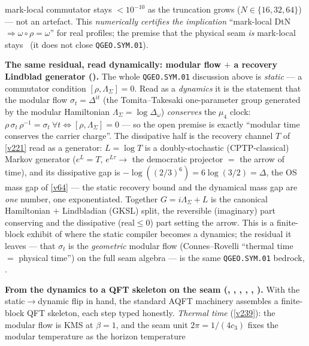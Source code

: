 mark-local commutator stays $<10^{-10}$ as the truncation grows ($N\in\{16,32,64\}$) --- not an artefact.
This \emph{numerically certifies the implication} ``mark-local DtN $\Rightarrow\omega\circ\rho=\omega$'' for
real profiles; the premise that the physical seam \emph{is} mark-local stays \mO\ (it does not close
\texttt{QGEO.SYM.01}).
\par\smallskip\noindent\textbf{The same residual, read dynamically: modular flow $+$ a recovery
Lindblad generator ().} The whole \texttt{QGEO.SYM.01}
discussion above is \emph{static} --- a commutator condition $[\rho,\Lambda_\Sigma]=0$. Read as a
\emph{dynamics} it is the statement that the modular flow $\sigma_t=\Delta^{it}$ (the Tomita--Takesaki
one-parameter group generated by the modular Hamiltonian $\Lambda_\Sigma=\log\Delta_\omega$)
\emph{conserves} the $\mu_4$ clock: $\rho\,\sigma_t\,\rho^{-1}=\sigma_t\ \forall t\Leftrightarrow
[\rho,\Lambda_\Sigma]=0$ --- so the open premise is exactly ``modular time conserves the carrier
charge''. The dissipative half is the recovery channel $T$ of \vref{v221} read as a generator:
$L=\log T$ is a doubly-stochastic (CPTP-classical) Markov generator ($e^{L}=T$, $e^{L\tau}\to$ the
democratic projector $=$ the arrow of time), and its dissipative gap is $-\log((2/3)^6)=6\log(3/2)=
\Delta$, the OS mass gap of \vref{v64} --- the static recovery bound and the dynamical mass gap are
\emph{one} number, one exponentiated. Together $G=i\Lambda_\Sigma+L$ is the canonical Hamiltonian
$+$ Lindbladian (GKSL) split, the reversible (imaginary) part conserving and the dissipative
(real$\le0$) part setting the arrow. This is a finite-block exhibit of where the static compiler
becomes a dynamics; the residual it leaves --- that $\sigma_t$ is the \emph{geometric} modular flow
(Connes--Rovelli ``thermal time $=$ physical time'') on the full seam algebra --- is the same
\texttt{QGEO.SYM.01} bedrock, \mO.
\par\smallskip\noindent\textbf{From the dynamics to a QFT skeleton on the seam
(, ,
, ,
, ).}
With the static$\to$dynamic flip in hand, the standard AQFT machinery assembles a
finite-block QFT skeleton, each step typed honestly. \emph{Thermal time}
(\vref{v239}): the modular flow is KMS at $\beta=1$, and the seam unit
$2\pi=1/(4c_3)$ fixes the modular temperature as the horizon temperature
